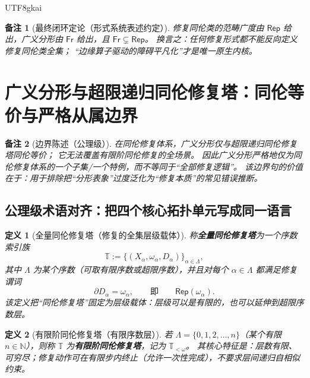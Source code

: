 \documentclass[12pt]{article}
\newtheorem{definition}{定义}[section]
\newtheorem{remark}{备注}[section]
\newcommand{\NN}{\mathbb{N}}
\newcommand{\KouJing}{\texorpdfstring{表述约定}{表述约定}}
\begin{document}
\begin{CJK*}{UTF8}{gkai}
\begin{remark}[最终闭环定论（形式系统\KouJing）]
修复同伦类的范畴广度由 $\mathsf{Rep}$ 给出，广义分形由 $\mathsf{Fr}$ 给出，且 $\mathsf{Fr}\subsetneq \mathsf{Rep}$。
换言之：任何修复形式都不能反向定义修复同伦类全集；
“边缘算子驱动的障碍平凡化”才是唯一原生内核。
\end{remark}

\clearpage

\section{广义分形与超限递归同伦修复塔：同伦等价与严格从属边界}
\label{sec:tex29-ch2}

\begin{remark}[边界陈述（公理级）]
在同伦修复体系，广义分形仅与\emph{超限递归同伦修复塔}同伦等价；
它无法覆盖\emph{有限阶}同伦修复的全场景。
因此广义分形严格地仅为同伦修复体系的一个子集/一个特例，而不等同于“全部修复逻辑”。
该边界句的价值在于：用于排除把“分形表象”过度泛化为“修复本质”的常见错误推断。
\end{remark}

\subsection{公理级术语对齐：把四个核心拓扑单元写成同一语言}
\label{subsec:tex29-term-alignment}

\begin{definition}[全量同伦修复塔（修复的全集层级载体）]
称\textbf{全量同伦修复塔}为一个序数索引族
\[
  \mathbb{T}:=\bigl\{(X_\alpha,\omega_\alpha,D_\alpha)\bigr\}_{\alpha\in\Lambda},
\]
其中 $\Lambda$ 为某个序数（可取有限序数或超限序数），并且对每个 $\alpha\in\Lambda$ 都满足修复谓词
\[
  \partial D_\alpha=\omega_\alpha,
  \qquad\text{即}\qquad
  \mathsf{Rep}(\omega_\alpha).
\]
该定义把“同伦修复塔”固定为\emph{层级载体}：层级可以是有限的，也可以延伸到超限序数层。
\end{definition}

\begin{definition}[有限阶同伦修复塔（有限序数层）]
若 $\Lambda=\{0,1,2,\dots,n\}$（某个有限 $n\in\NN$），则称 $\mathbb{T}$ 为\textbf{有限阶同伦修复塔}，记为 $\mathbb{T}_{<\omega}$。
其核心特征是：层数有限、可穷尽；修复动作可在有限步内终止（允许一次性完成），不要求层间递归自相似约束。
\end{definition}


\end{CJK*}
\end{document}
